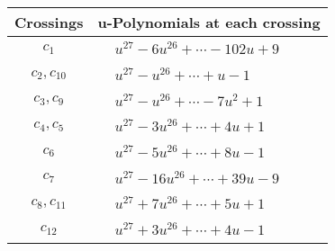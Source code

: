 \documentclass[1p]{elsarticle_modified}
\theoremstyle{definition}
\begin{document}
\begin{tabular}{m{50pt}|m{274pt}}
Crossings & \hspace{64pt}u-Polynomials at each crossing \\
\hline $$\begin{aligned}c_{1}\end{aligned}$$&$\begin{aligned}
&u^{27}-6 u^{26}+\cdots-102 u+9
\end{aligned}$\\
\hline $$\begin{aligned}c_{2},c_{10}\end{aligned}$$&$\begin{aligned}
&u^{27}- u^{26}+\cdots+u-1
\end{aligned}$\\
\hline $$\begin{aligned}c_{3},c_{9}\end{aligned}$$&$\begin{aligned}
&u^{27}- u^{26}+\cdots-7 u^2+1
\end{aligned}$\\
\hline $$\begin{aligned}c_{4},c_{5}\end{aligned}$$&$\begin{aligned}
&u^{27}-3 u^{26}+\cdots+4 u+1
\end{aligned}$\\
\hline $$\begin{aligned}c_{6}\end{aligned}$$&$\begin{aligned}
&u^{27}-5 u^{26}+\cdots+8 u-1
\end{aligned}$\\
\hline $$\begin{aligned}c_{7}\end{aligned}$$&$\begin{aligned}
&u^{27}-16 u^{26}+\cdots+39 u-9
\end{aligned}$\\
\hline $$\begin{aligned}c_{8},c_{11}\end{aligned}$$&$\begin{aligned}
&u^{27}+7 u^{26}+\cdots+5 u+1
\end{aligned}$\\
\hline $$\begin{aligned}c_{12}\end{aligned}$$&$\begin{aligned}
&u^{27}+3 u^{26}+\cdots+4 u-1
\end{aligned}$\\
\hline
\end{tabular}\\~\\
\end{document}

